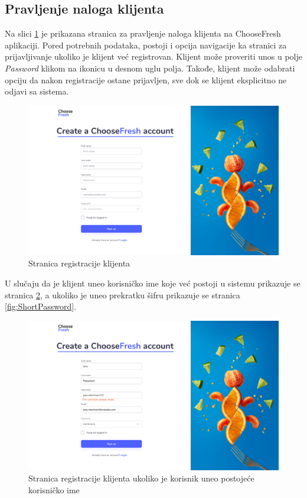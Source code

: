 \subsection{Pravljenje naloga klijenta}

Na slici \ref{fig:SignUp} je prikazana stranica za pravljenje naloga klijenta na ChooseFresh aplikaciji. Pored potrebnih podataka, postoji i opcija navigacije ka stranici za prijavljivanje ukoliko je klijent već registrovan. Klijent može proveriti unos u polje \textit{Password} klikom na ikonicu u desnom uglu polja. Takođe, klijent može odabrati opciju da nakon registracije ostane prijavljen, sve dok se klijent eksplicitno ne odjavi sa sistema.

\begin{figure}[H]
	\begin{center}
		\includegraphics[width=\textwidth]{UI/SignUp.jpg}
    		\caption{Stranica registracije klijenta}
    \label{fig:SignUp}
    \end{center}
\end{figure}


U slučaju da je klijent uneo korisničko ime koje već postoji u sistemu prikazuje se stranica \ref{fig:UsernameExists}, a ukoliko je uneo prekratku šifru prikazuje se stranica \ref{fig:ShortPassword}.

\begin{figure}[H]
	\begin{center}
		\includegraphics[width=\textwidth]{UI/UsernameExistsSignUp.jpg}
    		\caption{Stranica registracije klijenta ukoliko je korisnik uneo postojeće korisničko ime}
    \label{fig:UsernameExists}
    \end{center}
\end{figure}

